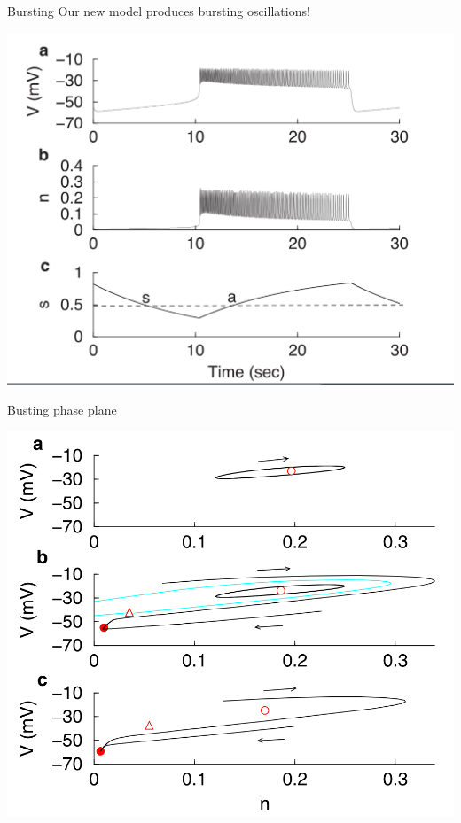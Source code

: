 \documentclass[presentation]{beamer}
\begin{document}
\begin{frame}[label={sec:org76d7187},plain]{Bursting}
Our new model produces bursting oscillations!

\begin{center}
\includegraphics[width=.8\textwidth]{./burst.png}
\end{center}
\end{frame}

\begin{frame}[label={sec:org8ff57eb},plain]{Busting phase plane}
\begin{center}
\includegraphics[width=.8\textwidth]{./burstplane.png}
\end{center}
\end{frame}
\end{document}
